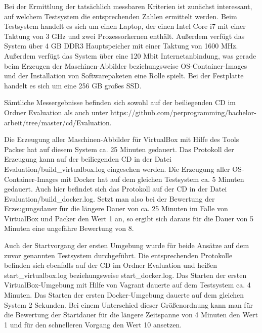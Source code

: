 Bei der Ermittlung der tatsächlich messbaren Kriterien ist zunächst interessant, auf welchem Testsystem die entsprechenden Zahlen ermittelt werden. Beim Testsystem handelt es sich um einen Laptop, der einen Intel Core i7 mit einer Taktung von 3 GHz und zwei Prozessorkernen enthält. Außerdem verfügt das System über 4 GB DDR3 Hauptspeicher mit einer Taktung von 1600 MHz. Außerdem verfügt das System über eine 120 Mbit Internetanbindung, was gerade beim Erzeugen der Maschinen-Abbilder beziehungsweise OS-Container-Images und der Installation von Softwarepaketen eine Rolle spielt. Bei der Festplatte handelt es sich um eine 256 GB großes \ac{SSD}.

Sämtliche Messergebnisse befinden sich sowohl auf der beiliegenden CD im Ordner Evaluation als auch unter https://github.com/perprogramming/bachelor-arbeit/tree/master/cd/Evaluation.

Die Erzeugung aller Maschinen-Abbilder für VirtualBox mit Hilfe des Tools Packer hat auf diesem System ca. 25 Minuten gedauert. Das Protokoll der Erzeugung kann auf der beiliegenden CD in der Datei Evaluation/build\_virtualbox.log eingesehen werden. Die Erzeugung aller OS-Container-Images mit Docker hat auf dem gleichen Testsystem ca. 5 Minuten gedauert. Auch hier befindet sich das Protokoll auf der CD in der Datei Evaluation/build\_docker.log. Setzt man also bei der Bewertung der Erzeugungsdauer für die längere Dauer von ca. 25 Minuten im Falle von VirtualBox und Packer den Wert 1 an, so ergibt sich daraus für die Dauer von 5 Minuten eine ungefähre Bewertung von 8.

Auch der Startvorgang der ersten Umgebung wurde für beide Ansätze auf dem zuvor genannten Testsystem durchgeführt. Die entsprechenden Protokolle befinden sich ebenfalls auf der CD im Ordner Evaluation und heißen start\_virtualbox.log beziehungsweise start\_docker.log. Das Starten der ersten VirtualBox-Umgebung mit Hilfe von Vagrant dauerte auf dem Testsystem ca. 4 Minuten. Das Starten der ersten Docker-Umgebung dauerte auf dem gleichen System 2 Sekunden. Bei einem Unterschied dieser Größenordnung kann man für die Bewertung der Startdauer für die längere Zeitspanne von 4 Minuten den Wert 1 und für den schnelleren Vorgang den Wert 10 ansetzen.

